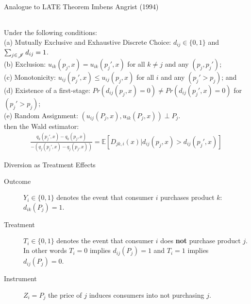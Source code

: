 \documentclass[aspectratio=169,10pt]{beamer}
\begin{document}
\begin{frame}{Analogue to LATE Theorem Imbens Angrist (1994)}
\begin{theorem}\ \\
\label{prop:late}
Under the following conditions:\\ 
(a) Mutually Exclusive and Exhaustive Discrete Choice: $d_{ij} \in \{0,1\}$ and $\sum_{j \in \mathscr{J}} d_{ij}=1$.\\
(b) Exclusion: $u_{ik}(p_j,x)=u_{ik}(p_j',x)$ for all $k \neq j$ and any $(p_j, p_j')$; \\
(c) Monotonicity: $u_{ij}(p_j',x) \leq u_{ij}(p_j,x)$ for all $i$ and any $(p_j' > p_{j})$; and \\
(d) Existence of a first-stage: $Pr(d_{ij}(p_j,x)=0) \neq Pr(d_{ij}(p_j',x)=0) $ for $(p_j' > p_{j})$; \\
(e) Random Assignment: $(u_{ij}(P_j,x),u_{ik}(P_j,x)) \perp P_j$. \\
\noindent
then the Wald estimator:
\begin{align*}
 \frac{q_k(p_j',x) - q_k(p_j,x)}{-\left(q_j(p_j',x) - q_j(p_j,x)\right)}=\mathbb{E}[D_{jk,i}(x) | d_{ij}(p_j,x) > d_{ij}(p_j',x)]
\end{align*}
\end{theorem}
\end{frame}

\begin{frame}{Diversion as Treatment Effects}
\begin{description}
\item[Outcome] $Y_i \in \{0,1\}$ denotes the event that consumer $i$ purchases product $k$: $d_{ik}(P_j)=1$.
\item[Treatment] $T_i \in \{0,1\}$ denotes the event that consumer $i$ does \textbf{not} purchase product $j$. In other words $T_i = 0$ implies $d_{ij}(P_j)=1$ and $T_i=1$ implies $d_{ij}(P_j)=0$.
\item[Instrument] $Z_i = P_j$ the price of $j$ induces consumers into not purchasing $j$.
\end{description}
\end{frame}
\end{document}
